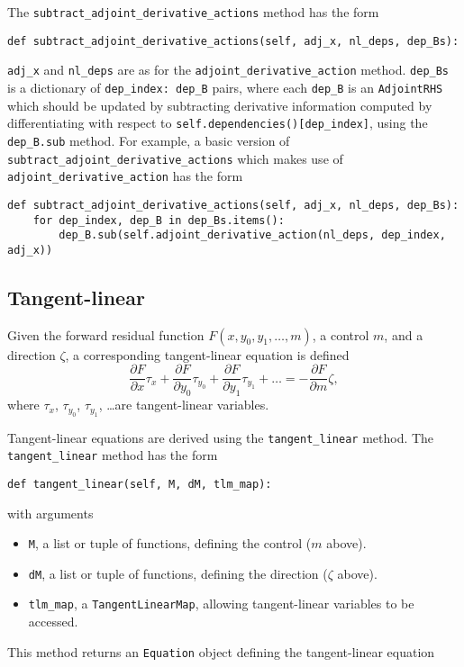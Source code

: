 \documentclass[11pt]{article}
\begin{document}
The \texttt{subtract\_adjoint\_derivative\_actions} method has the form
\begin{lstlisting}
def subtract_adjoint_derivative_actions(self, adj_x, nl_deps, dep_Bs):
\end{lstlisting}
\texttt{adj\_x} and \texttt{nl\_deps} are as for the
\texttt{adjoint\_derivative\_action} method. \texttt{dep\_Bs} is a dictionary
of \texttt{dep\_index: dep\_B} pairs, where each \texttt{dep\_B} is an
\texttt{AdjointRHS} which should be updated by subtracting derivative
information computed by differentiating with respect to
\texttt{self.dependencies()[dep\_index]}, using the \texttt{dep\_B.sub} method.
For example, a basic version of \texttt{subtract\_adjoint\_derivative\_actions}
which makes use of \texttt{adjoint\_derivative\_action} has the form
\begin{lstlisting}
def subtract_adjoint_derivative_actions(self, adj_x, nl_deps, dep_Bs):
    for dep_index, dep_B in dep_Bs.items():
        dep_B.sub(self.adjoint_derivative_action(nl_deps, dep_index, adj_x))
\end{lstlisting}

\subsection{Tangent-linear}\label{sect:tangent_linear}

Given the forward residual function $F \left( x, y_0, y_1, \ldots, m \right)$,
a control $m$, and a direction $\zeta$, a corresponding tangent-linear equation
is defined
\begin{equation*}
  \frac{\partial F}{\partial x} \tau_x
    + \frac{\partial F}{\partial y_0} \tau_{y_0}
    + \frac{\partial F}{\partial y_1} \tau_{y_1}
    + \ldots = -\frac{\partial F}{\partial m} \zeta,
\end{equation*}
where $\tau_x$, $\tau_{y_0}$, $\tau_{y_1}$, \ldots are tangent-linear
variables.

Tangent-linear equations are derived using the \texttt{tangent\_linear} method.
The \texttt{tangent\_linear} method has the form
\begin{lstlisting}
def tangent_linear(self, M, dM, tlm_map):
\end{lstlisting}
with arguments
\begin{itemize}
  \item \texttt{M}, a list or tuple of functions, defining the
    control ($m$ above).
  \item \texttt{dM}, a list or tuple of functions, defining the direction
    ($\zeta$ above).
  \item \texttt{tlm\_map}, a \texttt{TangentLinearMap}, allowing tangent-linear
    variables to be accessed.
\end{itemize}
This method returns an \texttt{Equation} object defining the tangent-linear
equation
\end{document}
